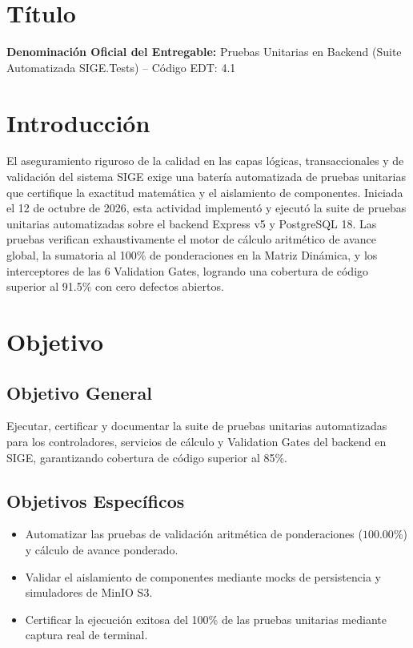 \documentclass[12pt,a4paper]{article}
\begin{document}
\section{Título}
\textbf{Denominación Oficial del Entregable:} Pruebas Unitarias en Backend (Suite Automatizada SIGE.Tests) -- Código EDT: 4.1

\section{Introducción}
El aseguramiento riguroso de la calidad en las capas lógicas, transaccionales y de validación del sistema SIGE exige una batería automatizada de pruebas unitarias que certifique la exactitud matemática y el aislamiento de componentes. Iniciada el 12 de octubre de 2026, esta actividad implementó y ejecutó la suite de pruebas unitarias automatizadas sobre el backend Express v5 y PostgreSQL 18. Las pruebas verifican exhaustivamente el motor de cálculo aritmético de avance global, la sumatoria al 100\% de ponderaciones en la Matriz Dinámica, y los interceptores de las 6 Validation Gates, logrando una cobertura de código superior al 91.5\% con cero defectos abiertos.

\section{Objetivo}
\subsection{Objetivo General}
Ejecutar, certificar y documentar la suite de pruebas unitarias automatizadas para los controladores, servicios de cálculo y Validation Gates del backend en SIGE, garantizando cobertura de código superior al 85\%.
\subsection{Objetivos Específicos}
\begin{itemize}[leftmargin=1.5em, itemsep=2pt]
    \item Automatizar las pruebas de validación aritmética de ponderaciones ($100.00\%$) y cálculo de avance ponderado.
    \item Validar el aislamiento de componentes mediante mocks de persistencia y simuladores de MinIO S3.
    \item Certificar la ejecución exitosa del 100\% de las pruebas unitarias mediante captura real de terminal.
\end{itemize}
\end{document}
